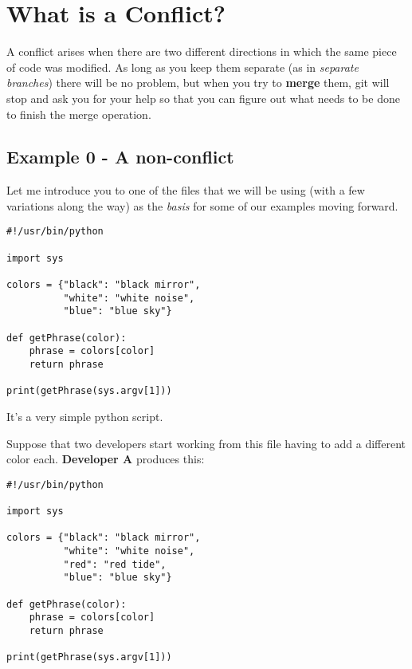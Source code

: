 
\section{What is a Conflict?}

A conflict arises when there are two different directions in which the same piece of code was modified. As long as you keep them separate
(as in {\it separate branches}) there will be no problem, but when you try to {\bf merge} them, git will stop and ask you for your help
so that you can figure out what needs to be done to finish the merge operation.

\subsection{Example 0 - A non-conflict}
\label{example_00}

Let me introduce you to one of the files that we will be using (with a few variations along the way) as the {\it basis} for some of our
examples moving forward.

\begin{lstlisting}[style=python_style, caption={\bf Example 0} - common ancestor]
#!/usr/bin/python

import sys

colors = {"black": "black mirror",
          "white": "white noise",
          "blue": "blue sky"}

def getPhrase(color):
    phrase = colors[color]
    return phrase

print(getPhrase(sys.argv[1]))
\end{lstlisting}

It's a very simple python script.

Suppose that two developers start working from this file having to add a different color each. {\bf Developer A} produces this:

\begin{lstlisting}[style=python_style, caption={\bf Example 0} - Developer A]
#!/usr/bin/python

import sys

colors = {"black": "black mirror",
          "white": "white noise",
          "red": "red tide",
          "blue": "blue sky"}

def getPhrase(color):
    phrase = colors[color]
    return phrase

print(getPhrase(sys.argv[1]))
\end{lstlisting}

